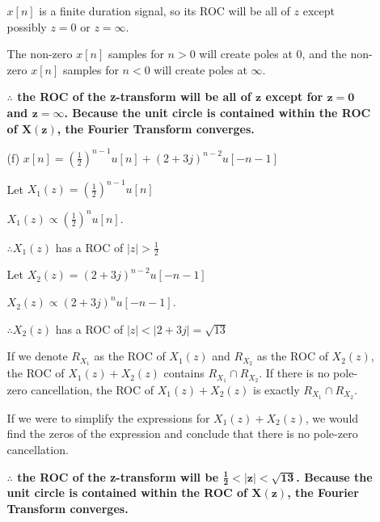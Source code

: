 \documentclass[fleqn]{article}
\begin{document}
\begin{enumerate}[nolistsep]
\begin{enumerate}[nolistsep]
					$x[n]$ is a finite duration signal, so its ROC will be all of $z$ except possibly $z = 0$ or $z = \infty$.
					
					The non-zero $x[n]$ samples for $n > 0$ will create poles at $0$, and the non-zero $x[n]$ samples for $n < 0$ will create poles at $\infty$.
					
					\textbf{$\mathbf{\therefore}$ the ROC of the z-transform will be all of $\mathbf{z}$ except for $\mathbf{z=0}$ and $\mathbf{z=\infty}$. Because the unit circle is contained within the ROC of $\mathbf{X(z)}$, the Fourier Transform converges.}
					
				\item[(f)] $x[n] = \left(\frac{1}{2}\right)^{n-1}u[n] + (2 + 3j)^{n-2}u[-n-1]$
				
				Let $X_1(z) = \left(\frac{1}{2}\right)^{n-1}u[n]$
				
				$X_1(z) \propto \left(\frac{1}{2}\right)^{n}u[n]$.
				
				$\therefore X_1(z)$ has a ROC of $|z| > \frac{1}{2}$
				
				Let $X_2(z) = (2 + 3j)^{n-2}u[-n-1]$
				
				$X_2(z) \propto (2 + 3j)^{n}u[-n-1]$.
				
				$\therefore X_2(z)$ has a ROC of $|z| < |2 + 3j| = \sqrt{13}$
				
				If we denote $R_{X_1}$ as the ROC of $X_1(z)$ and $R_{X_2}$ as the ROC of $X_2(z)$, the ROC of $X_1(z) + X_2(z)$ contains $R_{X_1} \cap R_{X_2}$. If there is no pole-zero cancellation, the ROC of $X_1(z) + X_2(z)$ is exactly $R_{X_1} \cap R_{X_2}$.
				
				If we were to simplify the expressions for $X_1(z) + X_2(z)$, we would find the zeros of the expression and conclude that there is no pole-zero cancellation.
				
				\textbf{$\mathbf{\therefore}$ the ROC of the z-transform will be $\mathbf{\frac{1}{2} < |z| < \sqrt{13}}$. Because the unit circle is contained within the ROC of $\mathbf{X(z)}$, the Fourier Transform converges.}
				
			\end{enumerate}
	\end{enumerate}
	
\end{document}
